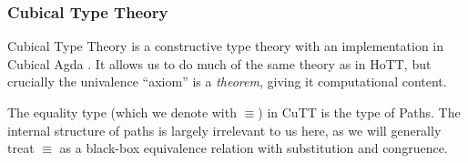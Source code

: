 \subsubsection{Cubical Type Theory}
Cubical Type Theory \cite{cohenCubicalTypeTheory2016} is a constructive type
theory with an implementation in Cubical Agda
\cite{vezzosiCubicalAgdaDependently2019}.
It allows us to do much of the same theory as in HoTT, but crucially the
univalence ``axiom'' is a \emph{theorem}, giving it computational content.
\begin{romdefinition} \label{path-types}
  The equality type (which we denote with \(\equiv\)) in CuTT is the type of
  Paths\footnotemark.
  The internal structure of paths is largely irrelevant to us here, as we will
  generally treat \(\equiv\) as a black-box equivalence relation with
  substitution and congruence.
\end{romdefinition}

